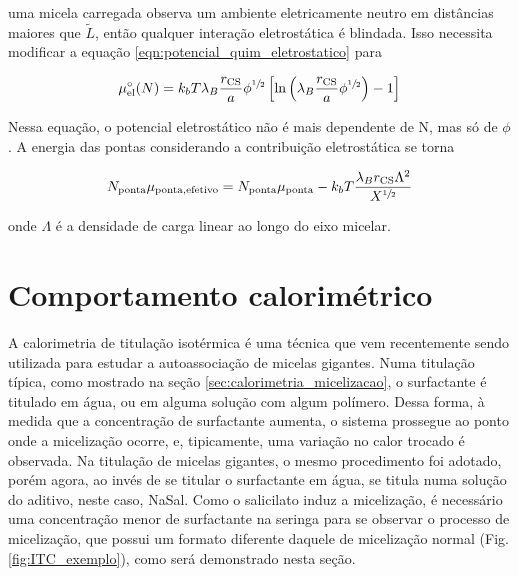 		\noindent uma micela carregada observa um ambiente eletricamente neutro em distâncias maiores que \(\tilde{L}\), então qualquer interação eletrostática é blindada. Isso necessita modificar a equação \ref{eqn:potencial_quim_eletrostatico} para 
		
		\begin{equation}
			\mu_\mathrm{el}^\circ(N) = k_b T \lambda_B \dfrac{r_\mathrm{CS}}{a} \phi^{\sfrac{1}{2}} \left[ \ln \left( \lambda_B \dfrac{r_\mathrm{CS}}{a} \phi^{\sfrac{1}{2}} \right) - 1 \right]
			\label{eqn:potencial_eletrostatico_semidiluido}
		\end{equation}
		
		Nessa equação, o potencial eletrostático não é mais dependente de N, mas só de \(\phi\). A energia das pontas considerando a contribuição eletrostática se torna
		
		\begin{equation}
			N_\mathrm{ponta}\mu_\mathrm{ponta, efetivo} = N_\mathrm{ponta}\mu_\mathrm{ponta} - k_b T \dfrac{\lambda_B r_\mathrm{CS} \Lambda^2}{X^{\sfrac{1}{2}}}
		\end{equation} 
		
		\noindent onde \(\Lambda\) é a densidade de carga linear ao longo do eixo micelar.
		

		\section{Comportamento calorimétrico} 
		
		A calorimetria de titulação isotérmica é uma técnica que vem recentemente sendo utilizada para estudar a autoassociação de micelas gigantes. %
		Numa titulação típica, como mostrado na seção \ref{sec:calorimetria_micelizacao}, o surfactante é titulado em água, ou em alguma solução com algum polímero. Dessa forma, à medida que a concentração de surfactante aumenta, o sistema prossegue ao ponto onde a micelização ocorre, e, tipicamente, uma variação no calor trocado é observada. Na titulação de micelas gigantes, o mesmo procedimento foi adotado, porém agora, ao invés de se titular o surfactante em água, se titula numa solução do aditivo, neste caso, NaSal. Como o salicilato induz a micelização, é necessário uma concentração menor de surfactante na seringa para se observar o processo de micelização, que possui um formato diferente daquele de micelização normal (Fig. \ref{fig:ITC_exemplo}), como será demonstrado nesta seção.
		
